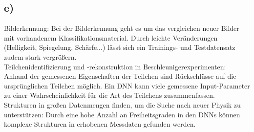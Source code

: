 \subsection*{e)}
Bilderkennung: Bei der Bilderkennung geht es um das vergleichen neuer Bilder mit vorhandenem Klassifikationsmaterial. Durch leichte Veränderungen (Helligkeit, Spiegelung, Schärfe...) lässt sich ein Trainings- und Testdatensatz zudem stark vergrößern.\\
Teilchenidentifizierung und -rekonstruktion in Beschleunigerexperimenten: Anhand der gemessenen Eigenschaften der Teilchen sind Rückschlüsse auf die ursprünglichen Teilchen möglich. Ein DNN kann viele gemessene Input-Parameter zu einer Wahrscheinlichkeit für die Art des Teilchens zusammenfassen.\\
Strukturen in großen Datenmengen finden, um die Suche nach neuer Physik zu unterstützen: Durch eine hohe Anzahl an Freiheitsgraden in den DNNs können komplexe Strukturen in erhobenen Messdaten gefunden werden.
